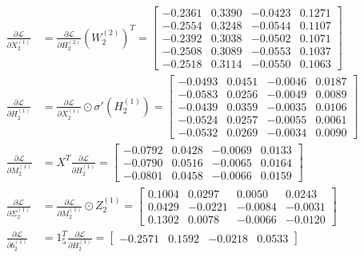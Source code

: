 \documentclass[11pt,a4paper]{article}
\def\mathbf#1{#1}%
\theoremstyle{plain}
\theoremstyle{definition}
\theoremstyle{remark}
\begin{document}
\begin{enumerate}
\begin{itemize}
        \begin{align}
            \frac{\partial \mathcal{L}}{\partial X^{(1)}_2} &= \frac{\partial \mathcal{L}}{\partial H^{(2)}_2} \left(W^{(2)}_2\right)^T = \begin{bmatrix}
                -0.2361 & 0.3390 & -0.0423 & 0.1271 \\
                -0.2554 & 0.3248 & -0.0544 & 0.1107 \\
                -0.2392 & 0.3038 & -0.0502 & 0.1071 \\
                -0.2508 & 0.3089 & -0.0553 & 0.1037 \\
                -0.2518 & 0.3114 & -0.0550 & 0.1063
            \end{bmatrix} \\[0.2em]
            \frac{\partial \mathcal{L}}{\partial H^{(1)}_2} &= \frac{\partial \mathcal{L}}{\partial X^{(1)}_2} \odot \sigma'\!\left(H^{(1)}_2\right) = \begin{bmatrix}
                -0.0493 & 0.0451 & -0.0046 & 0.0187 \\
                -0.0583 & 0.0256 & -0.0049 & 0.0089 \\
                -0.0439 & 0.0359 & -0.0035 & 0.0106 \\
                -0.0524 & 0.0257 & -0.0055 & 0.0061 \\
                -0.0532 & 0.0269 & -0.0034 & 0.0090
            \end{bmatrix} \\[0.2em]
            \frac{\partial \mathcal{L}}{\partial M^{(1)}_2} &= X^T \frac{\partial \mathcal{L}}{\partial H^{(1)}_2} = \begin{bmatrix}
                -0.0792 & 0.0428 & -0.0069 & 0.0133 \\
                -0.0790 & 0.0516 & -0.0065 & 0.0164 \\
                -0.0801 & 0.0458 & -0.0066 & 0.0159
            \end{bmatrix} \\[0.2em]
            \frac{\partial \mathcal{L}}{\partial \Sigma^{(1)}_2} &= \frac{\partial \mathcal{L}}{\partial M^{(1)}_2} \odot Z^{(1)}_2 = \begin{bmatrix}
                0.1004 &  0.0297 &  0.0050 &  0.0243 \\
                0.0429 & -0.0221 & -0.0084 & -0.0031 \\
                0.1302 &  0.0078 & -0.0066 & -0.0120
            \end{bmatrix} \\[0.2em]
            \frac{\partial \mathcal{L}}{\partial \mathbf{b}^{(1)}_2} &= \mathbf{1}_5^T \frac{\partial \mathcal{L}}{\partial H^{(1)}_2} = \begin{bmatrix} -0.2571 & 0.1592 & -0.0218 & 0.0533 \end{bmatrix}
        \end{align}
    \end{itemize}


\end{enumerate}
\end{document}
